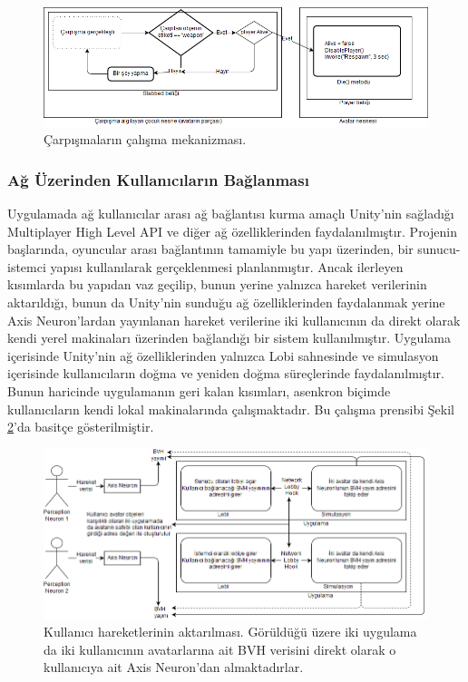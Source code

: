\documentclass[a4paper, 12pt, titlepage]{article}
\begin{document}
\begin{figure}
    \centering
        \includegraphics[width=6in]{images/col}
    \caption{Çarpışmaların çalışma mekanizması.}
    \label{col}
\end{figure}

\subsubsection{Ağ Üzerinden Kullanıcıların Bağlanması}
Uygulamada ağ kullanıcılar arası ağ bağlantısı kurma amaçlı Unity’nin sağladığı Multiplayer High
Level API ve diğer ağ özelliklerinden faydalanılmıştır. Projenin başlarında, oyuncular arası
bağlantının tamamiyle bu yapı üzerinden, bir sunucu-istemci yapısı kullanılarak gerçeklenmesi
planlanmıştır. Ancak ilerleyen kısımlarda bu yapıdan vaz geçilip, bunun yerine yalnızca hareket
verilerinin aktarıldığı, bunun da Unity’nin sunduğu ağ özelliklerinden faydalanmak yerine Axis
Neuron’lardan yayınlanan hareket verilerine iki kullanıcının da direkt olarak kendi yerel
makinaları üzerinden bağlandığı bir sistem kullanılmıştır. Uygulama içerisinde Unity’nin ağ
özelliklerinden yalnızca Lobi sahnesinde ve simulasyon içerisinde kullanıcıların doğma ve yeniden
doğma süreçlerinde faydalanılmıştır. Bunun haricinde uygulamanın geri kalan kısımları, asenkron
biçimde kullanıcıların kendi lokal makinalarında çalışmaktadır. Bu çalışma prensibi Şekil
\ref{net}’da basitçe gösterilmiştir.

\begin{figure}
    \centering
        \includegraphics[width=6in]{images/net}
    \caption{Kullanıcı hareketlerinin aktarılması. Görüldüğü üzere iki uygulama da iki kullanıcının
             avatarlarına ait BVH verisini direkt olarak o kullanıcıya ait Axis Neuron’dan
             almaktadırlar.}
    \label{net}
\end{figure}
\end{document}

